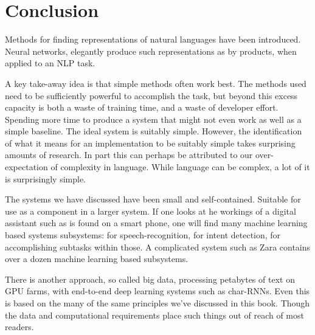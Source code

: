 \documentclass[12pt,parskip]{komatufte}
\begin{document}

\chapter{Conclusion}\label{sec:conclusion}

Methods for finding representations of natural languages have been introduced.
Neural networks, elegantly produce such representations as by products,
when applied to an NLP task.

A key take-away idea is that simple methods often work best.
The methods used need to be sufficiently powerful to accomplish the task,
but beyond this excess capacity is both a waste of training time,
and a waste of developer effort.
Spending more time to produce a system that might not even work as well as a simple baseline.
The ideal system is suitably simple.
However, the identification of what it means for an implementation to be suitably simple takes surprising amounts of research.
In part this can perhaps be attributed to our over-expectation of complexity in language.
While language can be complex, a lot of it is surprisingly simple.



The systems we have discussed have been small and self-contained.
Suitable for use as a component in a larger system.
If one looks at he workings of a digital assistant such as is found on a smart phone,
one will find many machine learning based systems subsystems:
for speech-recognition, for intent detection, for accomplishing subtasks within those.
A complicated system such as Zara  contains over a dozen machine learning based subsystems.


There is another approach, so called big data, processing petabytes of text on GPU farms,
with end-to-end deep learning systems such as char-RNNs.
Even this is based on the many of the same principles we've discussed in this book.
Though the data and computational requirements place such things out of reach of most readers.
\end{document}
